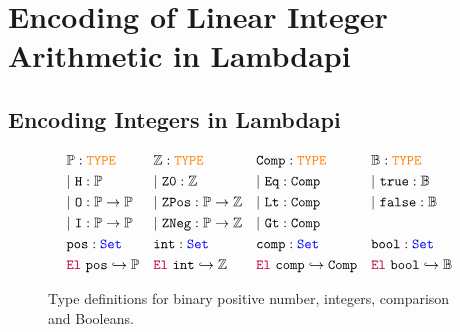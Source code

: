 \section{Encoding of Linear Integer Arithmetic in Lambdapi}
\label{sec:encoding}

\subsection{Encoding Integers in Lambdapi}


\begin{figure}
\centering
\begin{align*}\label{eq:eq1}
&\bb{P}: \type & &\bb{Z}: \type   & &\tt{Comp}: \type & &\bb{B}: \type \\
&|~\tt{H} : \bb{P} & &|~\tt{Z0}: \bb{Z} & &|~\tt{Eq}: \tt{Comp} & &|~\tt{true}: \bb{B} \\
&|~\tt{O}: \bb{P} \ra \bb{P} & &|~\tt{ZPos}: \bb{P} \ra \bb{Z} & &|~\tt{Lt}: \tt{Comp} & &|~\tt{false}: \bb{B} \\
&|~\tt{I}: \bb{P} \ra \bb{P} & &|~\tt{ZNeg}: \bb{P} \ra \bb{Z} & &|~\tt{Gt}: \tt{Comp} & &\\
&\tt{pos}: \set & &\tt{int}: \set & &\tt{comp}: \set & &\tt{bool}: \set \\
&\el~\tt{pos} \re \bb{P} & &\el~\tt{int} \re \bb{Z} & &\el~\tt{comp} \re \tt{Comp} & &\el~\tt{bool} \re \bb{B}
\end{align*}
\caption{Type definitions for binary positive number, integers, comparison and Booleans.}
\label{fig:sorts-constructors}
\end{figure}

